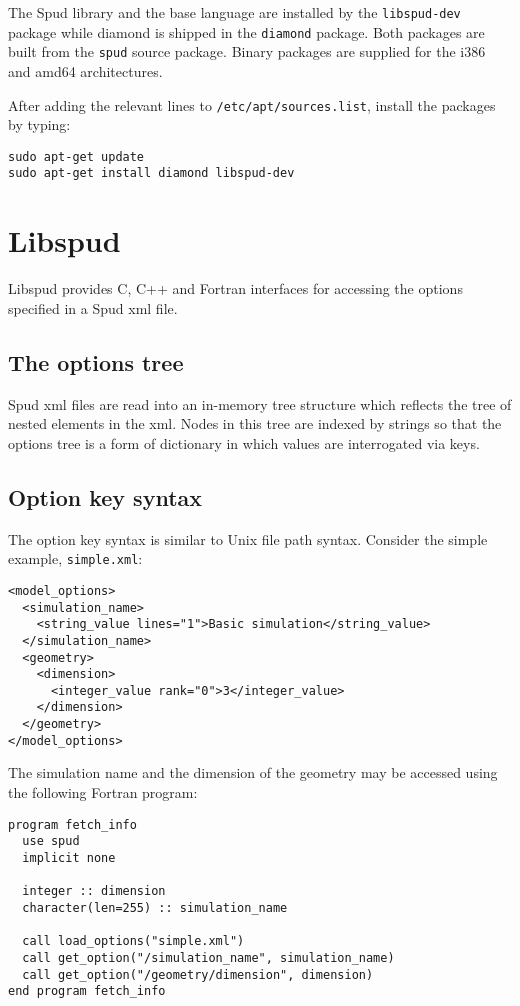 \documentclass[a4paper, 11pt]{book}
\begin{document}
The Spud library and the base language are installed by the
\verb+libspud-dev+ package while diamond is shipped in the \verb+diamond+
package. Both packages are built from the \verb+spud+ source package. Binary
packages are supplied for the i386 and amd64 architectures.

After adding the relevant lines to \verb+/etc/apt/sources.list+, install the
packages by typing:

\begin{verbatim}
sudo apt-get update
sudo apt-get install diamond libspud-dev
\end{verbatim}

\chapter{Libspud}

Libspud provides C, C++ and Fortran interfaces for accessing the options
specified in a Spud xml file. 

\section{The options tree}

Spud xml files are read into an in-memory tree structure which reflects the
tree of nested elements in the xml. Nodes in this tree are indexed by
strings so that the options tree is a form of dictionary in which values are
interrogated via keys. 

\section{Option key syntax}

The option key syntax is similar to Unix file path syntax.
Consider the simple example, \verb+simple.xml+:
\begin{verbatim}
<model_options>
  <simulation_name>
    <string_value lines="1">Basic simulation</string_value>
  </simulation_name>
  <geometry>
    <dimension>
      <integer_value rank="0">3</integer_value>
    </dimension>
  </geometry>
</model_options>                                                                                                                                                                                               
\end{verbatim}

The simulation name and the dimension of the geometry may be accessed
using the following Fortran program:
\begin{verbatim}
program fetch_info
  use spud
  implicit none

  integer :: dimension
  character(len=255) :: simulation_name

  call load_options("simple.xml")
  call get_option("/simulation_name", simulation_name)
  call get_option("/geometry/dimension", dimension)
end program fetch_info
\end{verbatim}
\end{document}
